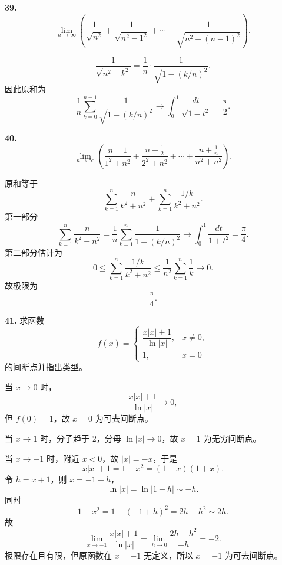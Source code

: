 \begin{problemblock}
\textbf{39.}
\[
\lim_{n\to\infty}
\left(
\frac1{\sqrt{n^2}}+
\frac1{\sqrt{n^2-1^2}}+\cdots+
\frac1{\sqrt{n^2-(n-1)^2}}
\right).
\]
\end{problemblock}

\begin{solutionblock}
\[
\frac1{\sqrt{n^2-k^2}}
=\frac1n\cdot\frac1{\sqrt{1-(k/n)^2}}.
\]
因此原和为
\[
\frac1n\sum_{k=0}^{n-1}
\frac1{\sqrt{1-(k/n)^2}}
\to\int_0^1\frac{dt}{\sqrt{1-t^2}}
=\frac\pi2.
\]
\end{solutionblock}

\begin{problemblock}
\textbf{40.}
\[
\lim_{n\to\infty}
\left(
\frac{n+1}{1^2+n^2}+
\frac{n+\frac12}{2^2+n^2}+\cdots+
\frac{n+\frac1n}{n^2+n^2}
\right).
\]
\end{problemblock}

\begin{solutionblock}
原和等于
\[
\sum_{k=1}^n\frac{n}{k^2+n^2}
+\sum_{k=1}^n\frac{1/k}{k^2+n^2}.
\]
第一部分
\[
\sum_{k=1}^n\frac{n}{k^2+n^2}
=\frac1n\sum_{k=1}^n\frac1{1+(k/n)^2}
\to\int_0^1\frac{dt}{1+t^2}
=\frac\pi4.
\]
第二部分估计为
\[
0\le
\sum_{k=1}^n\frac{1/k}{k^2+n^2}
\le \frac1{n^2}\sum_{k=1}^n\frac1k
\to0.
\]
故极限为
\[
\frac\pi4.
\]
\end{solutionblock}

\begin{problemblock}
\textbf{41.} 求函数
\[
f(x)=
\begin{cases}
\dfrac{x|x|+1}{\ln|x|},&x\ne0,\\
1,&x=0
\end{cases}
\]
的间断点并指出类型。
\end{problemblock}

\begin{solutionblock}
当 \(x\to0\) 时，
\[
\frac{x|x|+1}{\ln|x|}\to0,
\]
但 \(f(0)=1\)，故 \(x=0\) 为可去间断点。

当 \(x\to1\) 时，分子趋于 2，分母 \(\ln|x|\to0\)，故 \(x=1\) 为无穷间断点。

当 \(x\to-1\) 时，附近 \(x<0\)，故 \(|x|=-x\)，于是
\[
x|x|+1=1-x^2=(1-x)(1+x).
\]
令 \(h=x+1\)，则 \(x=-1+h\)，
\[
\ln|x|=\ln|1-h|\sim-h.
\]
同时
\[
1-x^2=1-(-1+h)^2=2h-h^2\sim2h.
\]
故
\[
\lim_{x\to-1}\frac{x|x|+1}{\ln|x|}
=\lim_{h\to0}\frac{2h-h^2}{-h}=-2.
\]
极限存在且有限，但原函数在 \(x=-1\) 无定义，所以 \(x=-1\) 为可去间断点。

\end{solutionblock}

